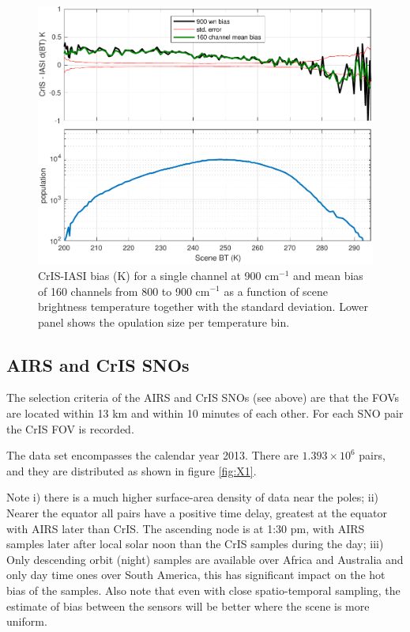 \documentclass[twocolumn,10pt]{article}
\begin{document}
\begin{figure}[htb]
\centering
\includegraphics[width=\linewidth]{./figs/ic_jpl_sno_bias_stderr_vs_scene_LW_chans.pdf}
\caption{
  CrIS-IASI bias (K) for a single channel at 900 cm$^{-1}$ and mean bias of 160 channels from 800 to 900 cm$^{-1}$ as a function of scene brightness temperature together with the standard deviation. Lower panel shows the opulation size per temperature bin.}
\label{fig:X8}
\end{figure}


\subsection{AIRS and CrIS SNOs}

The selection criteria of the AIRS and CrIS SNOs (see above) are that the FOVs are located
within 13 km and within 10 minutes of each other. For each SNO pair the CrIS FOV is recorded. 

The data set encompasses the calendar year 2013. There are $1.393\times 10^{6}$ pairs, and they are distributed as shown in figure \ref{fig:X1}.

Note i) there is a much higher surface-area density of data near the poles; 
ii) Nearer the equator all pairs have a positive time delay, greatest at the equator with AIRS later than CrIS. The ascending node is at 1:30 pm, with
AIRS samples later after local solar noon than the CrIS samples during the day; 
iii) Only descending orbit (night) samples are available over Africa and Australia and only day time ones over South America, this has significant impact on the hot bias of the samples. Also note that even with close spatio-temporal sampling, the estimate of bias between the sensors will be better where the scene is more uniform.
\end{document}
